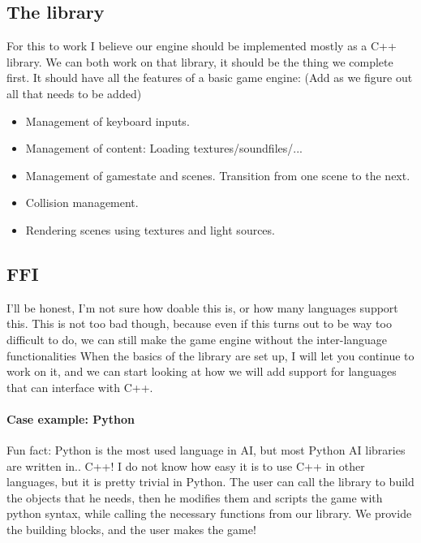 \documentclass{article}
\begin{document}
	\subsection{The library}
	For this to work I believe our engine should be implemented mostly as a C++ library. We can both work on that library, it should be the thing we complete first. It should have all the features of a basic game engine:
	(Add as we figure out all that needs to be added)
	\begin{itemize}
		\item Management of keyboard inputs.
		\item Management of content: Loading textures/soundfiles/...
		\item Management of gamestate and scenes. Transition from one scene to the next.
		\item Collision management.
		\item Rendering scenes using textures and light sources.
	\end{itemize}
	\subsection{FFI}
	I'll be honest, I'm not sure how doable this is, or how many languages support this. This is not too bad though, because even if this turns out to be way too difficult to do, we can still make the game engine without the inter-language functionalities
	When the basics of the library are set up, I will let you continue to work on it, and we can start looking at how we will add support for languages that can interface with C++.
	\paragraph{Case example: Python}
	Fun fact: Python is the most used language in AI, but most Python AI libraries are written in.. C++!
	I do not know how easy it is to use C++ in other languages, but it is pretty trivial in Python. The user can call the library to build the objects that he needs, then he modifies them and scripts the game with python syntax, while calling the necessary functions from our library. We provide the building blocks, and the user makes the game!
	
\end{document}
